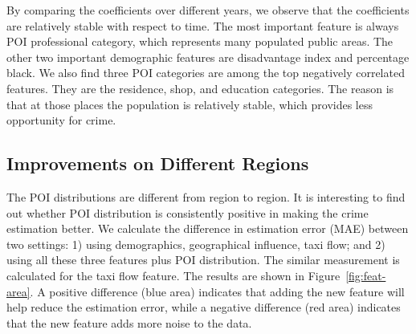 By comparing the coefficients over different years, we observe that the coefficients are relatively stable with respect to time. The most important feature is always POI professional category, which represents many populated public areas. The other two important demographic features are disadvantage index and percentage black. We also find three POI categories are among the top negatively correlated features. They are the residence, shop, and education categories. The reason is that at those places the population is relatively stable, which provides less opportunity for crime.
 

\begin{table}[h]
\centering
\caption{The coefficients of the top-6 features over different years. There are 21 different features in total. Due to limited space, we only show the top 3 features with the highest positive/negative coefficients respectively.}
\vspace{2mm}
\label{tb:fea-stability}
\end{table}



\subsection{Improvements on Different Regions}

The POI distributions are different from region to region. It is interesting to find out whether POI distribution is consistently positive in making the crime estimation better. We calculate the difference in estimation error (MAE) between two settings: 1) using demographics, geographical influence, taxi flow; and 2) using all these three features plus POI distribution. The similar measurement is calculated for the taxi flow feature. The results are shown in Figure~\ref{fig:feat-area}.  A positive difference (blue area) indicates that adding the new feature will help reduce the estimation error, while a negative difference (red area) indicates that the new feature adds more noise to the data.  

